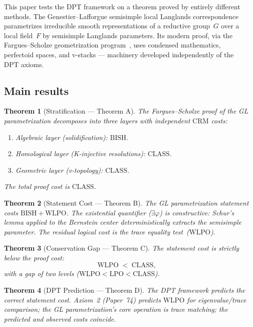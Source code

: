 \documentclass[12pt, a4paper]{article}
\theoremstyle{plain}
\newtheorem{theorem}{Theorem}[section]
\theoremstyle{definition}
\theoremstyle{remark}
\newcommand{\BISH}{\mathrm{BISH}}
\newcommand{\WLPO}{\mathrm{WLPO}}
\newcommand{\LPO}{\mathrm{LPO}}
\newcommand{\CLASS}{\mathrm{CLASS}}
\newcommand{\CRM}{\mathrm{CRM}}
\begin{document}
This paper tests the DPT framework on a theorem proved by entirely
different methods.  The Genestier--Lafforgue semisimple local Langlands
correspondence~\cite{genestier-lafforgue} parametrizes irreducible
smooth representations of a reductive group~$G$ over a local field~$F$
by semisimple Langlands parameters.  Its modern proof, via the
Fargues--Scholze geometrization program~\cite{fargues-scholze}, uses
condensed mathematics, perfectoid spaces, and v-stacks --- machinery
developed independently of the DPT axioms.

\subsection{Main results}

\begin{theorem}[Stratification --- Theorem A]\label{thm:A}
The Fargues--Scholze proof of the GL parametrization decomposes into
three layers with independent $\CRM$ costs:
\begin{enumerate}[label=(\roman*)]
  \item \emph{Algebraic layer} (solidification): $\BISH$.
  \item \emph{Homological layer} (K-injective resolutions): $\CLASS$.
  \item \emph{Geometric layer} (v-topology): $\CLASS$.
\end{enumerate}
The total proof cost is $\CLASS$.
\end{theorem}

\begin{theorem}[Statement Cost --- Theorem B]\label{thm:B}
The GL parametrization statement costs $\BISH + \WLPO$.  The existential
quantifier ($\exists\varphi$) is constructive: Schur's lemma applied to the
Bernstein center deterministically extracts the semisimple parameter.
The residual logical cost is the trace equality test~($\WLPO$).
\end{theorem}

\begin{theorem}[Conservation Gap --- Theorem C]\label{thm:C}
The statement cost is strictly below the proof cost:
\[
  \WLPO \;<\; \CLASS,
\]
with a gap of two levels ($\WLPO < \LPO < \CLASS$).
\end{theorem}

\begin{theorem}[DPT Prediction --- Theorem D]\label{thm:D}
The DPT framework predicts the correct statement cost.
Axiom~2 (Paper~74) predicts $\WLPO$ for eigenvalue/trace
comparison; the GL parametrization's core operation is trace
matching; the predicted and observed costs coincide.
\end{theorem}
\end{document}
